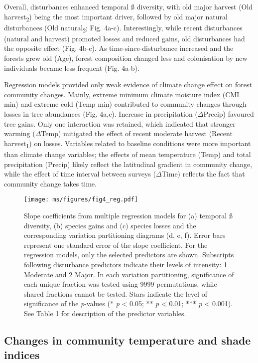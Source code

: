 \documentclass[
  a4paperpaper,
]{article}
\begin{document}
Overall, disturbances enhanced temporal ß diversity, with old major
harvest (Old harvest\textsubscript{2}) being the most important driver,
followed by old major natural disturbances (Old
natural\textsubscript{2}; Fig. 4a-c). Interestingly, while recent
disturbances (natural and harvest) promoted losses and reduced gains,
old disturbances had the opposite effect (Fig. 4b-c). As
time-since-disturbance increased and the forests grew old (Age), forest
composition changed less and colonisation by new individuals became less
frequent (Fig. 4a-b).

Regression models provided only weak evidence of climate change effect
on forest community changes. Mainly, extreme minimum climate moisture
index (CMI min) and extreme cold (Temp min) contributed to community
changes through losses in tree abundances (Fig. 4a,c). Increase in
precipitation (\(\Delta\)Precip) favoured tree gains. Only one
interaction was retained, which indicated that stronger warming
(\(\Delta\)Temp) mitigated the effect of recent moderate harvest (Recent
harvest\textsubscript{1}) on losses. Variables related to baseline
conditions were more important than climate change variables; the
effects of mean temperature (Temp) and total precipitation (Precip)
likely reflect the latitudinal gradient in community change, while the
effect of time interval between surveys (\(\Delta\)Time) reflects the
fact that community change takes time.

\begin{figure}
\centering
\texttt{[image: ms/figures/fig4\_reg.pdf]}
\caption{Slope coefficients from multiple regression models for (a)
temporal ß diversity, (b) species gains and (c) species losses and the
corresponding variation partitioning diagrams (d, e, f). Error bars
represent one standard error of the slope coefficient. For the
regression models, only the selected predictors are shown. Subscripts
following disturbance predictors indicate their levels of intensity: 1
Moderate and 2 Major. In each variation partitioning, significance of
each unique fraction was tested using 9999 permutations, while shared
fractions cannot be tested. Stars indicate the level of significance of
the \emph{p}-values (* \emph{p} \textless{} 0.05; ** \emph{p}
\textless{} 0.01; *** \emph{p} \textless{} 0.001). See Table 1 for
description of the predictor variables.}
\end{figure}

\hypertarget{changes-in-community-temperature-and-shade-indices}{%
\subsection{Changes in community temperature and shade
indices}\label{changes-in-community-temperature-and-shade-indices}}
\end{document}
